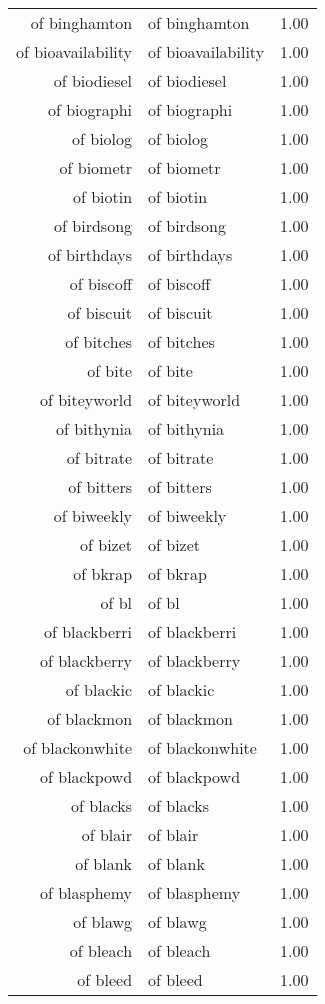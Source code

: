 \begin{table}[ht]
\begin{tabular}{rlr}
  of binghamton & of binghamton & 1.00 \\ 
  of bioavailability & of bioavailability & 1.00 \\ 
  of biodiesel & of biodiesel & 1.00 \\ 
  of biographi & of biographi & 1.00 \\ 
  of biolog & of biolog & 1.00 \\ 
  of biometr & of biometr & 1.00 \\ 
  of biotin & of biotin & 1.00 \\ 
  of birdsong & of birdsong & 1.00 \\ 
  of birthdays & of birthdays & 1.00 \\ 
  of biscoff & of biscoff & 1.00 \\ 
  of biscuit & of biscuit & 1.00 \\ 
  of bitches & of bitches & 1.00 \\ 
  of bite & of bite & 1.00 \\ 
  of biteyworld & of biteyworld & 1.00 \\ 
  of bithynia & of bithynia & 1.00 \\ 
  of bitrate & of bitrate & 1.00 \\ 
  of bitters & of bitters & 1.00 \\ 
  of biweekly & of biweekly & 1.00 \\ 
  of bizet & of bizet & 1.00 \\ 
  of bkrap & of bkrap & 1.00 \\ 
  of bl & of bl & 1.00 \\ 
  of blackberri & of blackberri & 1.00 \\ 
  of blackberry & of blackberry & 1.00 \\ 
  of blackic & of blackic & 1.00 \\ 
  of blackmon & of blackmon & 1.00 \\ 
  of blackonwhite & of blackonwhite & 1.00 \\ 
  of blackpowd & of blackpowd & 1.00 \\ 
  of blacks & of blacks & 1.00 \\ 
  of blair & of blair & 1.00 \\ 
  of blank & of blank & 1.00 \\ 
  of blasphemy & of blasphemy & 1.00 \\ 
  of blawg & of blawg & 1.00 \\ 
  of bleach & of bleach & 1.00 \\ 
  of bleed & of bleed & 1.00 \\ 

\end{tabular}
\end{table}

